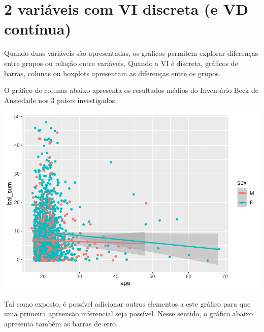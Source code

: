 \documentclass[
]{book}
\newenvironment{Shaded}{\begin{snugshade}}{\end{snugshade}}
\newcommand{\DataTypeTok}[1]{\textcolor[rgb]{0.13,0.29,0.53}{#1}}
\newcommand{\KeywordTok}[1]{\textcolor[rgb]{0.13,0.29,0.53}{\textbf{#1}}}
\newcommand{\NormalTok}[1]{#1}
\newcommand{\OperatorTok}[1]{\textcolor[rgb]{0.81,0.36,0.00}{\textbf{#1}}}
\newcommand{\StringTok}[1]{\textcolor[rgb]{0.31,0.60,0.02}{#1}}
\begin{document}
\hypertarget{variuxe1veis-com-vi-discreta-e-vd-contuxednua}{%
\section{2 variáveis com VI discreta (e VD
contínua)}\label{variuxe1veis-com-vi-discreta-e-vd-contuxednua}}

Quando duas variáveis são apresentadas, os gráficos permitem explorar
diferenças entre grupos ou relação entre variáveis. Quando a VI é
discreta, gráficos de barras, colunas ou boxplots apresentam as
diferenças entre os grupos.

O gráfico de colunas abaixo apresenta os resultados médios do Inventário
Beck de Ansiedade nos 3 países investigados.

\begin{Shaded}
\end{Shaded}

\begin{center}\includegraphics{gitbook-demo_files/figure-latex/unnamed-chunk-26-1} \end{center}

Tal como exposto, é possível adicionar outros elementos a este gráfico
para que uma primeira apreensão inferencial seja possível. Nesse
sentido, o gráfico abaixo apresenta também as barras de erro.
\end{document}
